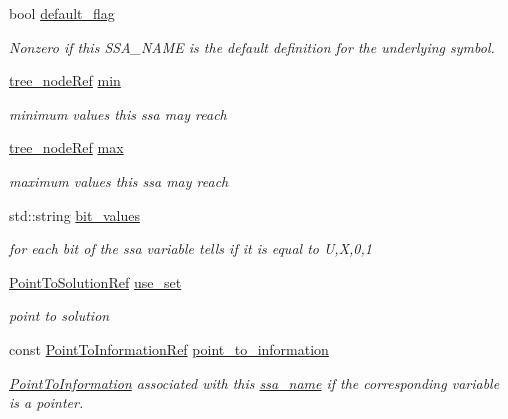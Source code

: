 \begin{DoxyCompactItemize}
bool \hyperlink{structssa__name_a1ba658dc0923f60b209eead05891c584}{default\+\_\+flag}
\begin{DoxyCompactList}\small\item\em Nonzero if this S\+S\+A\+\_\+\+N\+A\+ME is the default definition for the underlying symbol. \end{DoxyCompactList}\item 
\hyperlink{tree__node_8hpp_a6ee377554d1c4871ad66a337eaa67fd5}{tree\+\_\+node\+Ref} \hyperlink{structssa__name_a523462db8b8eef8217cd3ee8c395602c}{min}
\begin{DoxyCompactList}\small\item\em minimum values this ssa may reach \end{DoxyCompactList}\item 
\hyperlink{tree__node_8hpp_a6ee377554d1c4871ad66a337eaa67fd5}{tree\+\_\+node\+Ref} \hyperlink{structssa__name_ad67ae105cf2d0188ee9b12aebeb7ba67}{max}
\begin{DoxyCompactList}\small\item\em maximum values this ssa may reach \end{DoxyCompactList}\item 
std\+::string \hyperlink{structssa__name_a1e95b78cc7c668cba5f3472c78e44f66}{bit\+\_\+values}
\begin{DoxyCompactList}\small\item\em for each bit of the ssa variable tells if it is equal to U,X,0,1 \end{DoxyCompactList}\item 
\hyperlink{tree__node_8hpp_a4b5be0c528f25b8cb0b0fbc3b957d725}{Point\+To\+Solution\+Ref} \hyperlink{structssa__name_a479624c741ee4a0d9ba108694e67e000}{use\+\_\+set}
\begin{DoxyCompactList}\small\item\em point to solution \end{DoxyCompactList}\item 
const \hyperlink{tree__node_8hpp_aa7470417b67a13b20fb980e600e55d8d}{Point\+To\+Information\+Ref} \hyperlink{structssa__name_a8018a330033bc303b2de6fd0c9e29d87}{point\+\_\+to\+\_\+information}
\begin{DoxyCompactList}\small\item\em \hyperlink{structPointToInformation}{Point\+To\+Information} associated with this \hyperlink{structssa__name}{ssa\+\_\+name} if the corresponding variable is a pointer. \end{DoxyCompactList}\end{DoxyCompactItemize}
